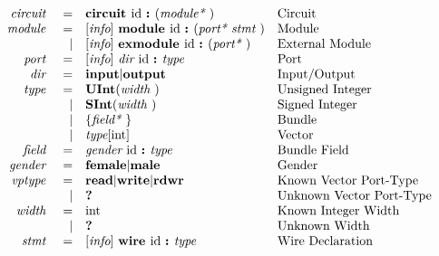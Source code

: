 \documentclass[12pt]{article}
\begin{document}
\[
\begin{array}{rrll}
\text{\em circuit\ }    &=     &\text{\bf circuit\ } \text{id } \text{\bf :\ } (\text{\em module*\ })                                        &\text{Circuit}\\
\text{\em module\ }     &=     &[\text{\em info}]\  \text{\bf module\ }  \text{id } \text{\bf :\ } (\text{\em port*\ } \text{\em stmt\ })                          &\text{Module}\\
                &\vert &[\text{\em info}]\  \text{\bf exmodule\ }  \text{id } \text{\bf :\ } (\text{\em port*\ })                                  &\text{External Module}\\
\text{\em port\ }       &=     &[\text{\em info}]\  \text{\em dir\ } \text{id } \text{\bf :\ } \text{\em type\ }                                           &\text{Port}\\
\text{\em dir\ }        &=     &\text{\bf input} \vert \text{\bf output}                                                &\text{Input/Output}\\
\text{\em type\ }       &=     &\text{\bf UInt}(\text{\em width\ })                                                        &\text{Unsigned Integer}\\
                &\vert &\text{\bf SInt}(\text{\em width\ })                                                        &\text{Signed Integer}\\
                &\vert &\{\text{\em field*\ }\}                                                         &\text{Bundle}\\
                &\vert &\text{\em type}[\text{int}]                                                             &\text{Vector}\\
\text{\em field\ }      &=     &\text{\em gender\ } \text{id } \text{\bf :\ } \text{\em type\ }                                              &\text{Bundle Field}\\
\text{\em gender\ }     &=     &\text{\bf female} \vert \text{\bf male}                                                 &\text{Gender}\\
\text{\em vptype\ }     &=     &\text{\bf read} \vert \text{\bf write} \vert \text{\bf rdwr}                                 &\text{Known Vector Port-Type}\\
                &\vert &\text{\bf ?\ }                                                                        &\text{Unknown Vector Port-Type}\\
\text{\em width\ }      &=     &\text{int}                                                                         &\text{Known Integer Width}\\
                &\vert &\text{\bf ?\ }                                                                        &\text{Unknown Width}\\
\text{\em stmt\ }       &=     &[\text{\em info}]\  \text{\bf wire\ } \text{id } \text{\bf :\ } \text{\em type\ }                                          &\text{Wire Declaration}\\

\end{array}\]
\end{document}
